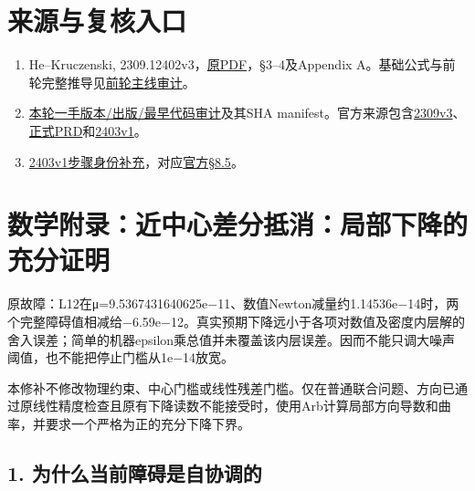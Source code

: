 \documentclass[
  10pt,
  a4paper,
]{article}
\begin{document}
\section{来源与复核入口}\label{ux6765ux6e90ux4e0eux590dux6838ux5165ux53e3}

\label{source-paper}

\begin{enumerate}
\def\labelenumi{\arabic{enumi}.}
\item
  He--Kruczenski,
  2309.12402v3，\href{../../../../references/2309.12402v3.pdf}{原PDF}，§3--4及Appendix
  A。基础公式与前轮完整推导见\href{../../physical_consistency_20260911/PV_CORE_CLAIM_AUDIT_ZH.md}{前轮主线审计}。
  \label{source-norm}
\item
  \href{../../../evidence/MAJOR_SOURCE_NORM_AUDIT_20260912/AUDIT_ZH.md}{本轮一手版本/出版/最早代码审计}及其SHA
  manifest。官方来源包含\href{https://arxiv.org/abs/2309.12402v3}{2309v3}、\href{https://journals.aps.org/prd/abstract/10.1103/PhysRevD.110.096001}{正式PRD}和\href{https://arxiv.org/abs/2403.10772v1}{2403v1}。
  \label{source-iteration}
\item
  \href{../../../evidence/MAJOR_SOURCE_NORM_AUDIT_20260912/ITERATION_SCOPE_ADDENDUM_ZH.md}{2403v1步骤身份补充}，对应\href{https://arxiv.org/html/2403.10772v1\#S8.SS5}{官方§8.5}。
\end{enumerate}

\clearpage

\section{数学附录：近中心差分抵消：局部下降的充分证明}\label{ux6570ux5b66ux9644ux5f55ux8fd1ux4e2dux5fc3ux5deeux5206ux62b5ux6d88ux5c40ux90e8ux4e0bux964dux7684ux5145ux5206ux8bc1ux660e}

原故障：L12在μ=9.5367431640625e−11、数值Newton减量约1.14536e−14时，两个完整障碍值相减给−6.59e−12。真实预期下降远小于各项对数值及密度内层解的舍入误差；简单的机器epsilon乘总值并未覆盖该内层误差。因而不能只调大噪声阈值，也不能把停止门槛从1e−14放宽。

本修补不修改物理约束、中心门槛或线性残差门槛。仅在普通联合问题、方向已通过原线性精度检查且原有下降读数不能接受时，使用Arb计算局部方向导数和曲率，并要求一个严格为正的充分下降下界。

\subsection{1.
为什么当前障碍是自协调的}\label{ux4e3aux4ec0ux4e48ux5f53ux524dux969cux788dux662fux81eaux534fux8c03ux7684}
\end{document}
